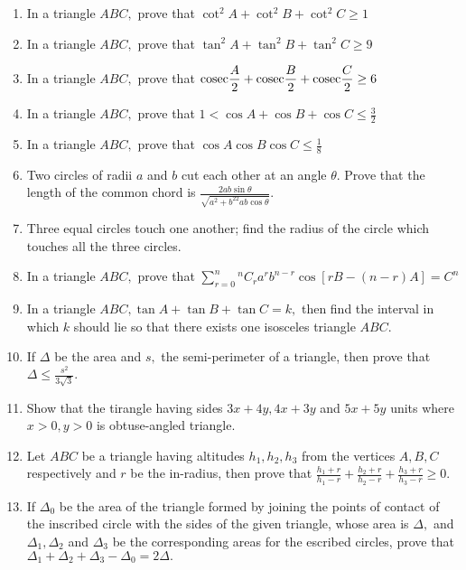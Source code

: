 \begin{enumerate}
\item In a triangle $ABC,$ prove that $\cot^2A + \cot^2B + \cot^2C\geq 1$

\item In a triangle $ABC,$ prove that $\tan^2A + \tan^2B + \tan^2C \geq 9$

\item In a triangle $ABC,$ prove that ${\rm cosec}\frac{A}{2} + {\rm cosec}\frac{B}{2} + {\rm cosec}\frac{C}{2} \geq 6$

\item In a triangle $ABC,$ prove that $1 < \cos A + \cos B + \cos C \leq \frac{3}{2}$

\item In a triangle $ABC,$ prove that $\cos A\cos B\cos C \leq \frac{1}{8}$

\item Two circles of radii $a$ and $b$ cut each other at an angle $\theta.$ Prove that the length of the common
   chord is $\frac{2ab\sin\theta}{\sqrt{a^2 + b^22ab\cos\theta}}.$

\item Three equal circles touch one another; find the radius of the circle which touches all the three circles.

\item In a triangle $ABC,$ prove that $\sum_{r=0}^n{}^nC_ra^rb^{n - r}\cos[rB - (n - r)A] = C^n$

\item In a triangle $ABC, \tan A + \tan B + \tan C = k,$ then find the interval in which $k$ should lie so that there
   exists one isosceles triangle $ABC.$

\item If $\Delta$ be the area and $s,$ the semi-perimeter of a triangle, then prove that $\Delta \leq
   \frac{s^2}{3\sqrt{3}}.$

\item Show that the tirangle having sides $3x + 4y, 4x + 3y$ and $5x + 5y$ units where $x > 0, y > 0$ is
   obtuse-angled triangle.

\item Let $ABC$ be a triangle having altitudes $h_1, h_2, h_3$ from the vertices $A, B, C$ respectively and
   $r$ be the in-radius, then prove that $\frac{h_1 + r}{h_1 - r} + \frac{h_2 + r}{h_2 - r} + \frac{h_3 + r}{h_3 -
   r}\geq 0.$

\item If $\Delta_0$ be the area of the triangle formed by joining the points of contact of the inscribed circle with the sides
   of the given triangle, whose area is $\Delta,$ and $\Delta_1, \Delta_2$ and $\Delta_3$ be the corresponding
   areas for the escribed circles, prove that $\Delta_1 + \Delta_2 + \Delta_3 - \Delta_0 = 2\Delta.$
\end{enumerate}
